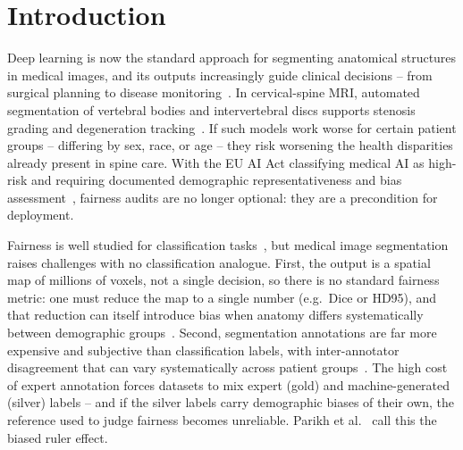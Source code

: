 \section{Introduction}

Deep learning is now the standard approach for segmenting anatomical structures
in medical images, and its outputs increasingly guide clinical decisions --
from surgical planning to disease
monitoring~\cite{isensee2021nnunet,isensee2024revisited}. In cervical-spine MRI,
automated segmentation of vertebral bodies and intervertebral discs supports
stenosis grading and degeneration tracking~\cite{zhou2025cspineseg}. If such
models work worse for certain patient groups -- differing by sex, race, or age --
they risk worsening the health disparities already present in spine care.
With the EU AI Act classifying medical AI as high-risk and requiring
documented demographic representativeness and bias
assessment~\cite{euaiact2024}, fairness audits are no longer optional: they are
a precondition for deployment.

Fairness is well studied for classification
tasks~\cite{bird2020fairlearn,eeoc1978uniform}, but medical image segmentation
raises challenges with no classification analogue. First, the output is a spatial
map of millions of voxels, not a single decision, so there is no standard
fairness metric: one must reduce the map to a single number (e.g.\ Dice or HD95),
and that reduction can itself introduce bias when anatomy differs systematically
between demographic groups~\cite{raina2023ndsc,tian2024fairseg}. Second,
segmentation annotations are far more expensive and subjective than classification
labels, with inter-annotator disagreement that can vary systematically across
patient groups~\cite{parikh2025labelbias}. The high cost of expert annotation forces
datasets to mix expert (gold) and machine-generated (silver) labels -- and if the
silver labels carry demographic biases of their own, the reference used to judge
fairness becomes unreliable. Parikh et al.~\cite{parikh2025labelbias} call this
the biased ruler effect.

